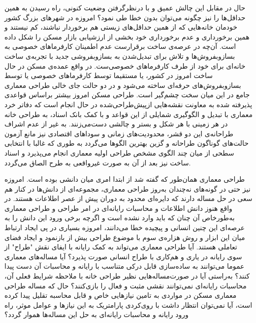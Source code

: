 \documentclass{report}
\begin{document}
حال در مقابل این چالش عمیق و با درنظرگرفتن وضعیت کنونی، راه رسیدن به همین حداقل‌ها را نیز چگونه می‌توان بدون خطا طی نمود؟ امروزه در شهرهای بزرگ کشور خودمان خانه‌هایی که از همین حداقل‌های زیستی هم برخوردار نباشند، کم نیستند و همین برخورداری و عدم برخورداری خود بخشی از ارزشیابی بازار مسکن را شکل داده است. آن‌چه در عرصه‌ی ساخت برقرارست عدم اطمینان کارفرماهای خصوصی به بسازوبفروش‌ها و تلاش برای تبدیل‌شدن به بسازوبفروشی جدید با تجربه‌‌ی ساخت خانه‌ای برای خود از طرف کارفرماهای خصوصی‌ست. در واقع عمده‌ی مسکن در حال ساخت امروز در کشور، یا مستقیما توسط کارفرماهای خصوصی یا توسط بسازوبفروش‌های حرفه‌ای ساخته می‌شود و در دو حالت جای خالی طراحی معماری جامع در این میان سخت چشم‌گیر است. طراحی مسکن امروز بیشتر براساس قواعدی پذیرفته شده به معاونت نقشه‌هایی ازپیش‌طراحی‌شده در حال انجام است که دفاتر خرد معماری با تبدیل و الگوگیری شمایلی از این قواعد و با کمک بانک اسناد، به طراحی خانه در هر زمینی با هر شکل و بستر و چالشی دست‌می‌زنند. به غیر از عدم اشراف طراحانه‌ی این دو قشر، محدودیت‌های زمانی و سوداهای اقتصادی نیز مانع آزمون حالت‌های گوناگون طراحانه و گزین بهترین الگوها می‌گردد به طوری که غالبا با انتخابی سطحی از میان چند الگوی مشخص طراحی اولیه معماری انجام می‌پذیرد و اسناد ساخت نیز بعد از آن به صورت غیرواقعی به طرح الصاق می‌گردد.

طراحی معماری همان‌طور که گفته شد از ابتدا امری میان دانشی بوده است. امروزه نیز حتی در گونه‌های نه‌چندان به‌روز طراحی معماری، مجموعه‌ای از دانش‌ها در کنار هم سعی در حل مساله دارند که دایره‌ا‌ی محدود به دوران پیش از عصر اطلاعات هستند. در واقع هنوز دانش اطلاعات و محاسبات رایانه‌ای در امر طراحی و طراحی معماری به‌طورخاص آن چنان که باید وارد نشده است و اگرچه برخی ورود این دانش را به عرصه‌ای این چنین انسانی و پیچیده خطا می‌دانند، امروزه بسیاری در پی ایجاد ارتباط میان این ابزار و روش هزاره‌ی سوم با موضوع طراحی بیش از بازنمود و ایجاد فضای تعاملی هستند. آیا طراحی معماری می‌تواند به کمک رایانه با ایفای نقش "طراح" از سوی رایانه در یاری و هم‌کاری با طراح انسانی صورت پذیرد؟ آیا مساله‌های معماری عموما می‌توانند به ساده‌سازی قابل درکی متناسب با رایانه و محاسبات آن دست پیدا کنند؟ به‌راستی آیا در صورت‌مساله‌هایی نظیر طراحی خانه با ملاحظه شرایط فعلی آن، محاسبات رایانه‌ای نمی‌توانند نقشی مثبت و فعال را بازی‌کنند؟ حال که مساله طراحی معماری مسکن در مواردی به تامین نیازهایی خاص و قابل محاسبه تقلیل پیدا کرده است، آیا نمی‌توان انتظار داشت با روی‌کردی پارامتریک به این نیازها و عوامل موثر، راه ورود رایانه و محاسبات رایانه‌ای به حل این مساله‌ها هموار گردد؟
\end{document}
